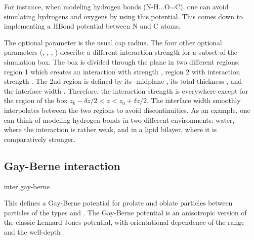 For instance, when modeling hydrogen bonds (N-H...O=C), one can avoid
simulating hydrogens and oxygens by using this potential. This comes down to
implementing a HBond potential between N and C atoms.

The optional parameter  is the usual cap radius. The four
other optional parameters (, , \var{\kappa},
) describe a different interaction strength  for
a subset of the simulation box. The box is divided through the  plane
in two different regions: region 1 which creates an interaction with strength
\var{\epsilon}, region 2 with interaction strength . The 2nd
region is defined by its -midplane , its total thickness
, and the interface width \var{\kappa}. Therefore, the
interaction strength is \var{\epsilon} everywhere except for the region of the
box $z_0-\delta z/2<z<z_0+\delta z/2$. The interface width smoothly
interpolates between the two regions to avoid discontinuities. As an example,
one can think of modeling hydrogen bonds in two different environments: water,
where the interaction is rather weak, and in a lipid bilayer, where it is
comparatively stronger.

\subsection{Gay-Berne interaction}

\begin{essyntax}
  inter   gay-berne
    
    \var{\mu} \var{\nu}
  \begin{features}
  \end{features}
\end{essyntax}
This defines a Gay-Berne potential for prolate and oblate particles
between particles of the types  and . The
Gay-Berne potential is an anisotropic version of the classic
Lennard-Jones potential, with orientational dependence of the range
 and the well-depth .

